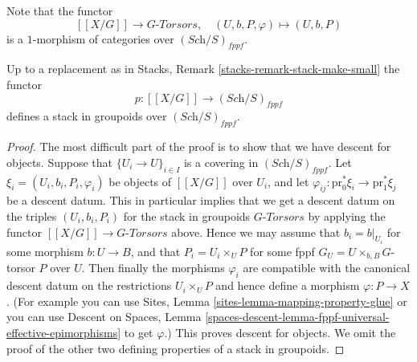 \medskip\noindent
Note that the functor
$$
[[X/G]] \longrightarrow G\textit{-Torsors},
\quad
(U, b, P, \varphi) \longmapsto (U, b, P)
$$
is a $1$-morphism of categories over $(\textit{Sch}/S)_{fppf}$.

\begin{lemma}
\label{lemma-group-quotient-stack-in-groupoids}
Up to a replacement as in
Stacks, Remark \ref{stacks-remark-stack-make-small}
the functor
$$
p : [[X/G]] \longrightarrow (\textit{Sch}/S)_{fppf}
$$
defines a stack in groupoids over $(\textit{Sch}/S)_{fppf}$.
\end{lemma}

\begin{proof}
The most difficult part of the proof is to show that we have descent for
objects. Suppose that $\{U_i \to U\}_{i \in I}$ is a covering in
$(\textit{Sch}/S)_{fppf}$. Let
$\xi_i = (U_i, b_i, P_i, \varphi_i)$ be objects of $[[X/G]]$ over $U_i$,
and let $\varphi_{ij} : \text{pr}_0^*\xi_i \to \text{pr}_1^*\xi_j$
be a descent datum. This in particular implies that we get a descent
datum on the triples $(U_i, b_i, P_i)$ for the stack in groupoids
$G\textit{-Torsors}$ by applying the functor
$[[X/G]] \to G\textit{-Torsors}$ above. Hence we may assume that
$b_i = b|_{U_i}$ for some morphism $b : U \to B$, and
that $P_i = U_i \times_U P$ for some fppf $G_U = U \times_{b, B} G$-torsor
$P$ over $U$. Then finally the morphisms $\varphi_i$ are compatible
with the canonical descent datum on the restrictions $U_i \times_U P$
and hence define a morphism $\varphi : P \to X$. (For example you
can use
Sites, Lemma \ref{sites-lemma-mapping-property-glue}
or you can use
Descent on Spaces,
Lemma \ref{spaces-descent-lemma-fppf-universal-effective-epimorphisms}
to get $\varphi$.)
This proves descent for objects.
We omit the proof of the other two defining properties of a stack in
groupoids.
\end{proof}

